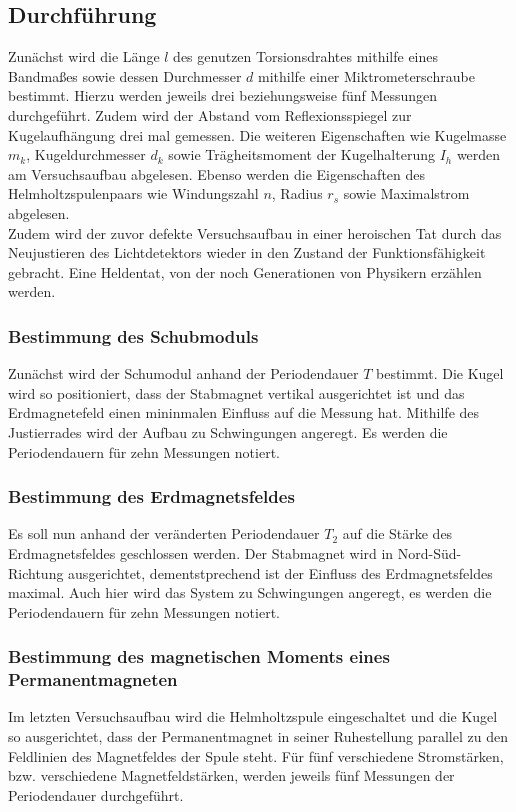 \subsection{Durchführung}
Zunächst wird die Länge $l$ des genutzen Torsionsdrahtes mithilfe eines Bandmaßes sowie dessen Durchmesser $d$ mithilfe einer Miktrometerschraube bestimmt.
Hierzu werden jeweils drei beziehungsweise fünf Messungen durchgeführt.
Zudem wird der Abstand vom Reflexionsspiegel zur Kugelaufhängung drei mal gemessen.
Die weiteren Eigenschaften wie Kugelmasse $m_k$, Kugeldurchmesser $d_k$ sowie Trägheitsmoment der Kugelhalterung $I_h$ werden am Versuchsaufbau abgelesen.
Ebenso werden die Eigenschaften des Helmholtzspulenpaars wie Windungszahl $n$, Radius $r_s$ sowie Maximalstrom abgelesen.\\
Zudem wird der zuvor defekte Versuchsaufbau in einer heroischen Tat durch das Neujustieren des Lichtdetektors wieder in den Zustand der Funktionsfähigkeit gebracht.
Eine Heldentat, von der noch Generationen von Physikern erzählen werden.\\
\subsubsection{Bestimmung des Schubmoduls}
Zunächst wird der Schumodul anhand der Periodendauer $T$ bestimmt.
Die Kugel wird so positioniert, dass der Stabmagnet vertikal ausgerichtet ist und das Erdmagnetefeld einen mininmalen Einfluss auf die Messung hat.
Mithilfe des Justierrades wird der Aufbau zu Schwingungen angeregt.
Es werden die Periodendauern für zehn Messungen notiert.
\subsubsection{Bestimmung des Erdmagnetsfeldes}
Es soll nun anhand der veränderten Periodendauer $T_2$ auf die Stärke des Erdmagnetsfeldes geschlossen werden.
Der Stabmagnet wird in Nord-Süd-Richtung ausgerichtet, dementstprechend ist der Einfluss des Erdmagnetsfeldes maximal.
Auch hier wird das System zu Schwingungen angeregt, es werden die Periodendauern für zehn Messungen notiert.
\subsubsection{Bestimmung des magnetischen Moments eines Permanentmagneten}
Im letzten Versuchsaufbau wird die Helmholtzspule eingeschaltet und die Kugel so ausgerichtet, dass der Permanentmagnet in seiner Ruhestellung parallel zu den Feldlinien des Magnetfeldes der Spule steht.
Für fünf verschiedene Stromstärken, bzw. verschiedene Magnetfeldstärken, werden jeweils fünf Messungen der Periodendauer durchgeführt.
